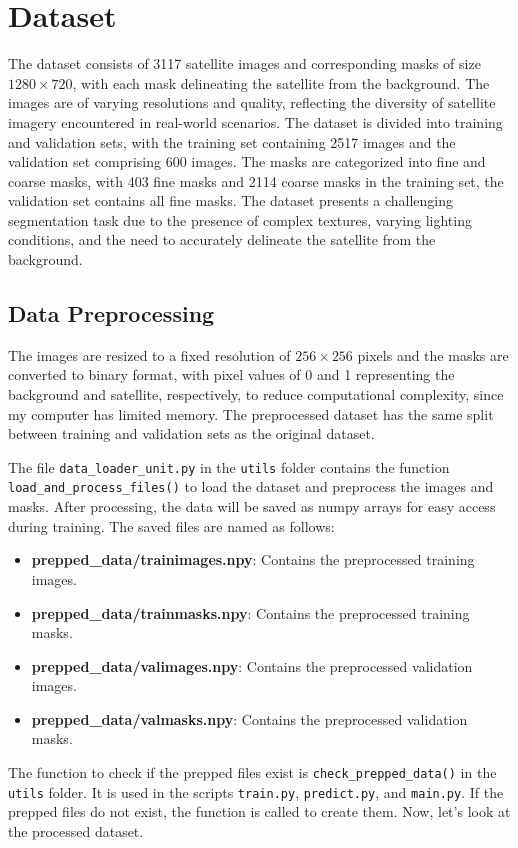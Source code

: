 \documentclass{article}
\begin{document}
\section{Dataset}
The dataset consists of 3117 satellite images and corresponding masks of size $1280 \times 720$, with each 
mask delineating the satellite from the background. The images are of varying resolutions and quality, 
reflecting the diversity of satellite imagery encountered in real-world scenarios. The dataset is divided 
into training and validation sets, with the training set containing 2517 images and the validation set
comprising 600 images. The masks are categorized into fine and coarse masks, with 403 fine masks
and 2114 coarse masks in the training set, the validation set contains all fine masks. The dataset presents a 
challenging segmentation task due to the presence of complex textures, varying lighting conditions, and the 
need to accurately delineate the satellite from the background.


\subsection{Data Preprocessing}

The images
are resized to a fixed resolution of $256 \times 256$ pixels and the masks are converted to binary format, with 
pixel values of 0 and 1 representing the background and satellite, respectively, to reduce computational
complexity, since my computer has limited memory. The preprocessed dataset has the same split between training 
and validation sets as the original dataset.
\vspace{1em}

The file \texttt{data\_loader\_unit.py} in the \texttt{utils} folder contains the function 
\texttt{load\_and\_process\_files()} to load the dataset and preprocess the images and masks. After processing, 
the data will be saved as numpy arrays for easy access during training. The saved files are named as follows:

\begin{itemize}
    \item \textbf{prepped\_data/trainimages.npy}: Contains the preprocessed training images.
    \item \textbf{prepped\_data/trainmasks.npy}: Contains the preprocessed training masks.
    \item \textbf{prepped\_data/valimages.npy}: Contains the preprocessed validation images.
    \item \textbf{prepped\_data/valmasks.npy}: Contains the preprocessed validation masks.
\end{itemize}
\vspace{1em}

The function to check if the prepped files exist is \texttt{check\_prepped\_data()} in the \texttt{utils} folder.
It is used in the scripts \texttt{train.py}, \texttt{predict.py}, and \texttt{main.py}. If the prepped files 
do not exist, the function is called to create them. Now, let's look at the processed dataset.
\end{document}
